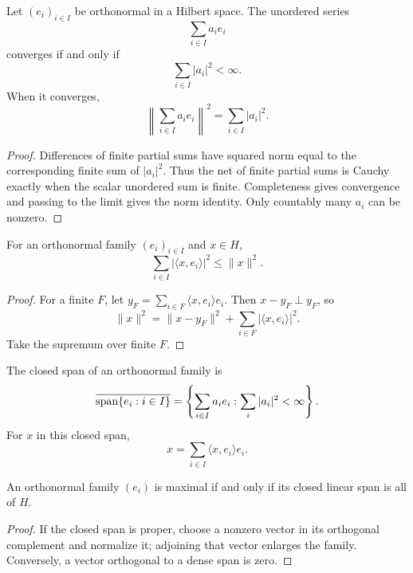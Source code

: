 \begin{notetheorem}
Let $(e_i)_{i\in I}$ be orthonormal in a Hilbert space.  The unordered series
\[
  \sum_{i\in I}a_ie_i
\]
converges if and only if
\[
  \sum_{i\in I}|a_i|^2<\infty.
\]
When it converges,
\[
  \left\|\sum_{i\in I}a_ie_i\right\|^2
  =\sum_{i\in I}|a_i|^2.
\]
\end{notetheorem}

\begin{proof}
Differences of finite partial sums have squared norm equal to the corresponding
finite sum of $|a_i|^2$.  Thus the net of finite partial sums is Cauchy exactly
when the scalar unordered sum is finite.  Completeness gives convergence and
passing to the limit gives the norm identity.  Only countably many $a_i$ can
be nonzero.
\end{proof}

\begin{notetheorem}
For an orthonormal family $(e_i)_{i\in I}$ and $x\in H$,
\[
  \sum_{i\in I}|\langle x,e_i\rangle|^2\le\|x\|^2.
\]
\end{notetheorem}

\begin{proof}
For a finite $F$, let
$y_F=\sum_{i\in F}\langle x,e_i\rangle e_i$.  Then
$x-y_F\perp y_F$, so
\[
  \|x\|^2=\|x-y_F\|^2+\sum_{i\in F}|\langle x,e_i\rangle|^2.
\]
Take the supremum over finite $F$.
\end{proof}

\begin{notetheorem}
The closed span of an orthonormal family is
\[
  \overline{\operatorname{span}\{e_i:i\in I\}}
  =\left\{\sum_{i\in I}a_ie_i:
       \sum_i|a_i|^2<\infty\right\}.
\]
For $x$ in this closed span,
\[
  x=\sum_{i\in I}\langle x,e_i\rangle e_i.
\]
\end{notetheorem}

\begin{notetheorem}
An orthonormal family $(e_i)$ is maximal if and only if its closed linear span
is all of $H$.
\end{notetheorem}

\begin{proof}
If the closed span is proper, choose a nonzero vector in its orthogonal
complement and normalize it; adjoining that vector enlarges the family.
Conversely, a vector orthogonal to a dense span is zero.
\end{proof}

